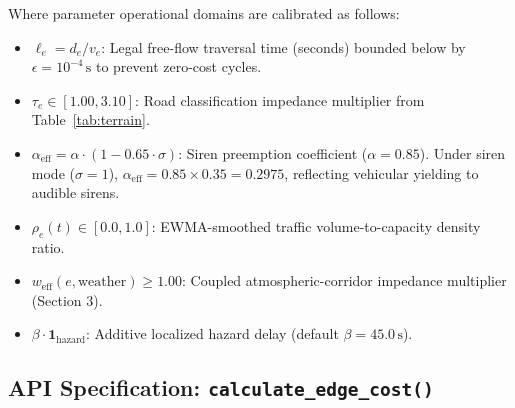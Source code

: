 \documentclass[10pt,a4paper]{article}
\begin{document}
Where parameter operational domains are calibrated as follows:
\begin{itemize}\setlength{\itemsep}{1.5pt}\setlength{\topsep}{1pt}
  \item $\ell_e = d_e / v_e$: Legal free-flow traversal time (seconds) bounded below by $\epsilon = 10^{-4}\,\text{s}$ to prevent zero-cost cycles.
  \item $\tau_e \in [1.00, 3.10]$: Road classification impedance multiplier from Table~\ref{tab:terrain}.
  \item $\alpha_{\text{eff}} = \alpha \cdot (1 - 0.65 \cdot \sigma)$: Siren preemption coefficient ($\alpha = 0.85$). Under siren mode ($\sigma = 1$), $\alpha_{\text{eff}} = 0.85 \times 0.35 = 0.2975$, reflecting vehicular yielding to audible sirens.
  \item $\rho_e(t) \in [0.0, 1.0]$: EWMA-smoothed traffic volume-to-capacity density ratio.
  \item $w_{\text{eff}}(e, \text{weather}) \ge 1.00$: Coupled atmospheric-corridor impedance multiplier (Section 3).
  \item $\beta \cdot \mathbf{1}_{\text{hazard}}$: Additive localized hazard delay (default $\beta = 45.0\,\text{s}$).
\end{itemize}

\subsection{API Specification: \texttt{calculate\_edge\_cost()}}
\end{document}
